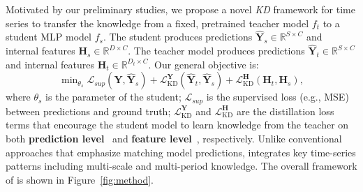 Motivated by our preliminary studies, we propose a novel \textit{KD} framework \method{} for time series to transfer the knowledge from a fixed, pretrained teacher model \(f_t\) to a student MLP model \(f_s\). The student produces predictions \(\mathbf{\hat{Y}}_s \in \mathbb{R}^{S \times C}\) and internal features \(\mathbf{H}_s\in \mathbb{R}^{D \times C}\). The teacher model produces predictions \(\mathbf{\hat{Y}}_t \in \mathbb{R}^{S \times C}\) and internal features \(\mathbf{H}_t\in \mathbb{R}^{D_t \times C}\). Our general objective is:
\begin{equation}\label{eq:kd_obj}
    \min\nolimits_{\theta_s} \mathcal{L}_{sup}(\mathbf{Y}, \mathbf{\hat{Y}}_s) + \mathcal{L}_{\mathrm{KD}}^\mathbf{Y}(\mathbf{\hat{Y}}_t, \mathbf{\hat{Y}}_s) + \mathcal{L}_{\mathrm{KD}}^\mathbf{H}(\mathbf{H}_t, \mathbf{H}_s),
\end{equation}
where \(\theta_s\) is the parameter of the student; \(\mathcal{L}_{sup}\) is the supervised loss (e.g., MSE) between predictions and ground truth; \(\mathcal{L}_{\mathrm{KD}}^\mathbf{Y}\) and \(\mathcal{L}_{\mathrm{KD}}^\mathbf{H}\) are the distillation loss terms that encourage the student model to learn knowledge from the teacher on both \textbf{prediction level}~\cite{hinton2015distilling} and \textbf{feature level}~\cite{romero2014fitnets}, respectively. Unlike conventional approaches that emphasize matching model predictions, \method{} integrates key time-series patterns including multi-scale and multi-period knowledge. The overall framework of \method{} is shown in Figure~\ref{fig:method}. 




